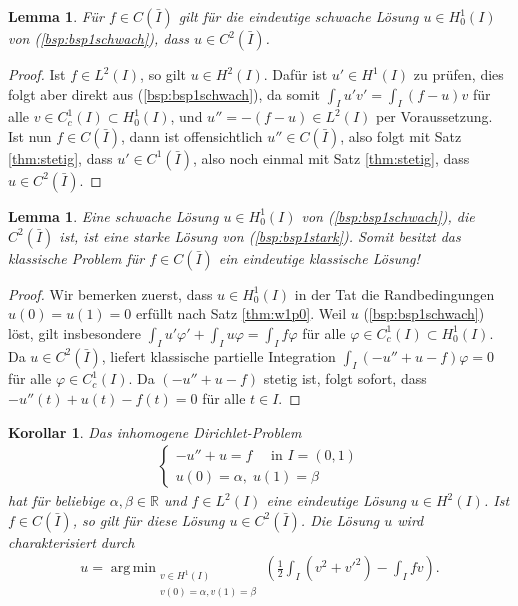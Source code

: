 \documentclass[twoside]{article}
\newtheorem{lemma}[theorem]{Lemma}
\newtheorem{corollary}[theorem]{Korollar}
\theoremstyle{definition}
\DeclareMathOperator*{\argmin}{arg\,min}
\begin{document}
\begin{lemma}
Für $f \in C(\bar{I})$ gilt für die eindeutige schwache Lösung $u \in H_0^1(I)$ von (\ref{bsp:bsp1schwach}), dass $u \in C^2(\bar{I})$.
\end{lemma}
\begin{proof}
Ist $f \in L^2(I)$, so gilt $u \in H^2(I)$. Dafür ist $u' \in H^1(I)$ zu prüfen, dies folgt aber direkt aus (\ref{bsp:bsp1schwach}), da somit $\int_I u' v' = \int_I (f-u) v$ für alle $v \in C_c^1(I) \subset H_0^1(I)$, und $u'' = -(f-u) \in L^2(I)$ per Voraussetzung. Ist nun $f \in C(\bar{I})$, dann ist offensichtlich $u'' \in C(\bar{I})$, also folgt mit Satz \ref{thm:stetig}, dass $u' \in C^1(\bar{I})$, also noch einmal mit Satz \ref{thm:stetig}, dass $u \in C^2(\bar{I})$.
\end{proof}
\begin{lemma} \label{lemma:schwachstark}
Eine schwache Lösung $u \in H^1_0(I)$ von (\ref{bsp:bsp1schwach}), die $C^2(\bar{I})$ ist, ist eine starke Lösung von (\ref{bsp:bsp1stark}). Somit besitzt das klassische Problem für $f \in C(\bar{I})$ ein eindeutige klassische Lösung!
\end{lemma}
\begin{proof}
Wir bemerken zuerst, dass $u \in H^1_0(I)$ in der Tat die Randbedingungen $u(0)=u(1)=0$ erfüllt nach Satz \ref{thm:w1p0}. Weil $u$  (\ref{bsp:bsp1schwach}) löst, gilt insbesondere $\int_I u'\varphi' + \int_I u\varphi = \int_I f\varphi$ für alle $\varphi \in C_c^1(I) \subset H^1_0(I)$. Da $u \in C^2(\bar{I})$, liefert klassische partielle Integration $\int_I (-u'' + u - f) \varphi= 0$ für alle $\varphi \in C_c^1(I)$. Da $(-u'' + u - f)$ stetig ist, folgt sofort, dass $-u''(t) + u(t) - f(t)=0$ für alle $t \in I$.
\end{proof}
\begin{corollary} Das inhomogene Dirichlet-Problem
\begin{align}
\begin{cases}
-u'' + u = f \quad \text{ in } I = (0,1)\\
u(0)= \alpha, \;  u(1) = \beta
\end{cases}
\end{align}
hat für beliebige $\alpha,\beta \in \mathbb{R}$ und $f \in L^2(I)$ eine eindeutige Lösung $u \in H^2(I)$. Ist $f \in C(\bar{I})$, so gilt für diese Lösung $u \in C^2(\bar{I})$. Die Lösung $u$ wird charakterisiert durch
\begin{align*}
u = \argmin_{\substack{v \in H^1(I)\\v(0)=\alpha,v(1)=\beta}} \left(\frac{1}{2} \int_I (v^2+v'^2)-\int_I fv \right).
\end{align*}
\end{corollary}
\end{document}
